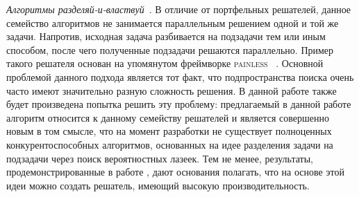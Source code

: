 \textit{Алгоритмы разделяй-и-властвуй}~\cite{bib:divide-and-conquer}. В отличие от портфельных 
решателей, данное семейство алгоритмов не занимается параллельным решением одной и той же задачи. 
Напротив, исходная задача разбивается на подзадачи тем или иным способом, после чего полученные 
подзадачи решаются параллельно. Пример такого решателя основан на упомянутом фреймворке \textsc{painless}
~\cite{bib:dac-painless}. Основной проблемой данного подхода является тот факт, что подпространства 
поиска очень часто имеют значительно разную сложность решения. В данной работе также будет произведена
попытка решить эту проблему: предлагаемый в данной работе алгоритм относится к данному семейству
решателей и является совершенно новым в том смысле, что на момент разработки не существует
полноценных конкурентоспособных алгоритмов, основанных на идее разделения задачи на подзадачи через
поиск вероятностных лазеек. Тем не менее, результаты, продемонстрированные в работе ,
дают основания полагать, что на основе этой идеи можно создать решатель, имеющий высокую
производительность.

\finishrelatedwork

\chapterconclusion

